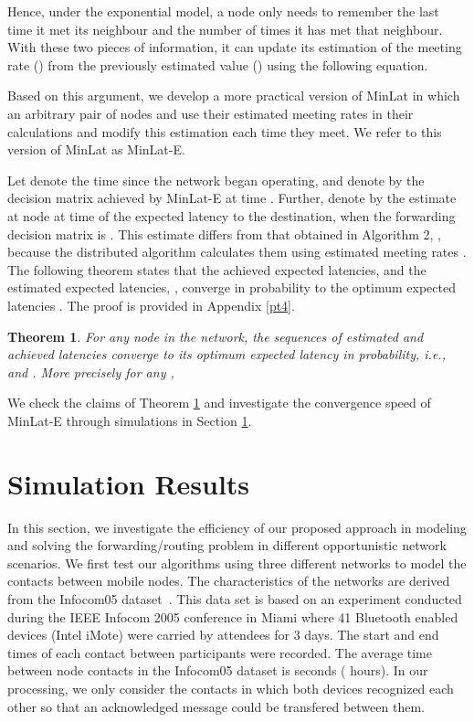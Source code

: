 \documentclass[journal,onecolumn,11pt]{IEEEtran}
\theoremstyle{plain}
\newtheorem{theorem}{Theorem}
\theoremstyle{definition}
\begin{document}
Hence, under the exponential model, a node only needs to remember the
last time it met its neighbour and the number of times it has met that
neighbour. With these two pieces of information, it can update its
estimation of the meeting rate () from the previously estimated value () using the following equation.

Based on this argument, we develop a more practical version of MinLat
in which an arbitrary pair of nodes  and  use their estimated
meeting rates  in their calculations and
modify this estimation each time they meet. We refer to this version
of MinLat as MinLat-E.

Let  denote the time since the network began operating, and denote
by  the decision matrix achieved by MinLat-E
at time . Further, denote by
 the estimate at
node  at time  of the expected latency to the destination, when
the forwarding decision matrix is . This
estimate differs from that obtained in Algorithm 2,
, because the distributed algorithm calculates
them using estimated meeting rates . The
following theorem states that the achieved expected latencies,
 and the estimated expected
latencies, , converge in probability to the
optimum expected latencies . The proof is
provided in Appendix \ref{pt4}.

\begin{theorem}\label{theorem4}
 For any node in the network, the sequences of estimated and achieved latencies converge to its optimum expected latency in probability, i.e.,  and . More precisely for any ,


\end{theorem}
 We check the claims of Theorem \ref{theorem4} and investigate the
 convergence speed of MinLat-E through simulations in Section
\ref{sec:res}. 

\section{Simulation Results}\label{sec:res} 
In this section, we investigate the efficiency of our
proposed approach in modeling and solving the forwarding/routing problem in
different opportunistic network scenarios. 
We first test our algorithms using three different
networks to model the contacts between  mobile nodes.
The characteristics of the networks are derived from the Infocom05 dataset~\cite{cambridge-haggle-2006-01-31}. This data set is based on an
experiment conducted during the IEEE Infocom 2005 conference in Miami
where 41 Bluetooth enabled devices (Intel iMote) were carried by
attendees for 3 days. The start and end times of each contact
between participants were recorded.  The average time between node
contacts in the Infocom05 dataset is  seconds (
hours). In our processing, we only consider the contacts in which both devices
recognized each other so that an acknowledged message could be
transfered between them. 
\end{document}
